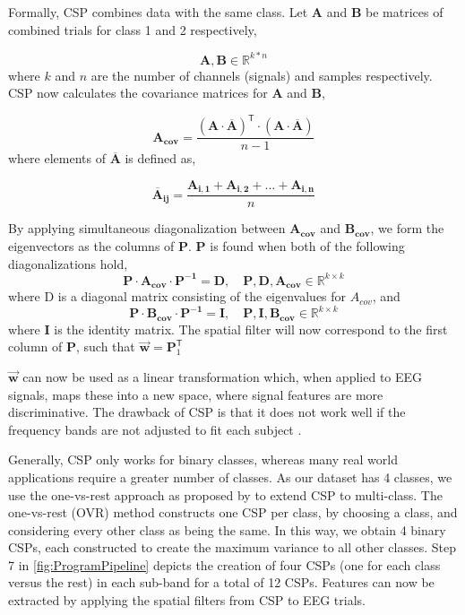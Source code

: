 Formally, CSP combines data with the same class. Let $\pmb{A}$ and $\pmb{B}$ be matrices of combined trials for class 1 and 2 respectively,

\begin{equation}
\label{eq:csp_data}
\pmb{A}, \mathbf{B} \in \mathbb{R}^{k*n}
\end{equation}
where $k$ and $n$ are the number of channels (signals) and samples respectively. CSP now calculates the covariance matrices for $\pmb{A}$ and $\pmb{B}$,

\begin{equation}
\label{eq:covariance_matrice}
\pmb{A_{cov}} = \frac{(\pmb{A} \cdot \overline{\pmb{A}})^\mathsf{T}  \cdot (\pmb{A} \cdot \overline{\pmb{A}})}{n - 1}
\end{equation}
where elements of $\overline{\pmb{A}}$ is defined as,

\begin{equation}
\label{eq:a_bar}
\pmb{\overline{A}_{ij}} = \frac{\pmb{A_{i,1}} + \pmb{A_{i,2}} + ... + \pmb{A_{i,n}}}{n}
\end{equation}

By applying simultaneous diagonalization between $\pmb{A_{cov}}$ and $\pmb{B_{cov}}$, we form the eigenvectors as the columns of $\pmb{P}$. $\pmb{P}$ is found when both of the following diagonalizations hold, 
\begin{equation}
\label{eq:diagonalization_A}
\pmb{P} \cdot \pmb{A_{cov}} \cdot \pmb{P^{-1}} = \pmb{D}, \quad \pmb{P}, \pmb{D}, \pmb{A_{cov}} \in \mathbb{R}^{k \times k}
\end{equation}
where D is a diagonal matrix consisting of the eigenvalues for $A_{cov}$, and
\begin{equation}
\label{eq:diagonalization_B}
\pmb{P} \cdot \pmb{B_{cov}} \cdot \pmb{P^{-1}} = \pmb{I}, \quad \pmb{P}, \pmb{I}, \pmb{B_{cov}} \in \mathbb{R}^{k \times k}
\end{equation}
where $\pmb{I}$ is the identity matrix. The spatial filter will now correspond to the first column of $\pmb{P}$, such that $\pmb{\vec{w}} = \pmb{P}^\mathsf{T}_{1}$ 

$\pmb{\vec{w}}$ can now be used as a linear transformation which, when applied to EEG signals, maps these into a new space, where signal features are more discriminative. The drawback of CSP is that it does not work well if the frequency bands are not adjusted to fit each subject \citep{novi2007sub}.

Generally, CSP only works for binary classes, whereas many real world applications require a greater number of classes. As our dataset has 4 classes, we use the one-vs-rest approach as proposed by \cite{ang2012filter} to extend CSP to multi-class. The one-vs-rest (OVR) method constructs one CSP per class, by choosing a class, and considering every other class as being the same. In this way, we obtain 4 binary CSPs, each constructed to create the maximum variance to all other classes. Step 7 in \cref{fig:ProgramPipeline} depicts the creation of four CSPs (one for each class versus the rest) in each sub-band for a total of 12 CSPs. Features can now be extracted by applying the spatial filters from CSP to EEG trials.

